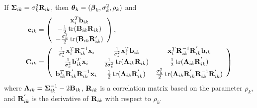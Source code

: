 \begin{theorem}
If $\boldsymbol\Sigma_{ik}=\sigma_{k}^{2}\mathbf R_{ik}$, then $\boldsymbol\theta_{k}=(\boldsymbol\beta_{k},\sigma^{2}_{k},\rho_{k})$ and
\begin{align*}
\mathbf c_{ik}&=\left( \begin{array}{c}\mathbf x_{i}^{T}\mathbf b_{ik}\\ -\frac{1}{2}\operatorname{tr}( \mathbf B_{ik} \mathbf R_{ik})\\ -\frac{\sigma^{2}_{k}}{2}\operatorname{tr}( \mathbf B_{ik} \mathbf R'_{ik})\end{array}\right),\\
\mathbf C_{ik}&=\left(\begin{array}{ccc} \frac{1}{\sigma_{k}^{2}}\mathbf x_{i}^{T}\mathbf R_{ik}^{-1}\mathbf x_{i}& \frac{1}{\sigma_{k}^{2}}\mathbf x_{i}^{T}\mathbf b_{ik}&\mathbf x_{i}^{T} \mathbf R_{ik}^{-1}\mathbf R^{'}_{ik}\mathbf b_{ik}\\  
\frac{1}{\sigma_{k}^{2}}\mathbf b^{T}_{ik}\mathbf x_{i}&\frac{1}{2\sigma^{2}_{k}}\operatorname{tr}(\boldsymbol \Lambda_{ik}\mathbf R_{ik})&\frac{1}{2}\operatorname{tr}(\boldsymbol \Lambda_{ik}\mathbf R^{'}_{ik})\\ 
\mathbf b_{ik}^{T}\mathbf R^{'}_{ik} \mathbf R_{ik}^{-1}\mathbf x_{i}&\frac{1}{2}\operatorname{tr}(\boldsymbol \Lambda_{ik}\mathbf R^{'}_{ik})&\frac{\sigma^{2}_{k}}{2}\operatorname{tr}(\boldsymbol \Lambda_{ik}\mathbf R^{'}_{ik}\mathbf R_{ik}^{-1}\mathbf R^{'}_{ik})
\end{array} \right)
\end{align*}
where $\boldsymbol \Lambda_{ik} = \boldsymbol\Sigma_{ik}^{-1}-2\mathbf B_{ik}$, $\mathbf R_{ik}$ is a correlation matrix based on the parameter $\rho_{k}$, and $\mathbf R^{'}_{ik}$ is the derivative of $\mathbf R_{ik}$ with respect to $\rho_{k}$. \\


\end{theorem}
